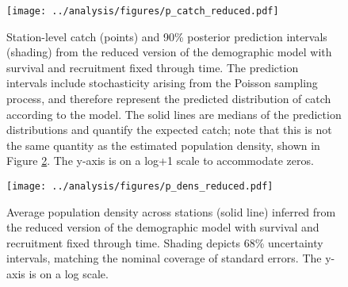\documentclass[11pt]{article}
\begin{document}
\begin{figure}
\centering
\texttt{[image: ../analysis/figures/p\_catch\_reduced.pdf]}
\caption{\label{fig:p_catch_reduced}
Station-level catch (points) and 90\% posterior prediction intervals (shading) 
from the reduced version of the demographic model 
with survival and recruitment fixed through time.
The prediction intervals include stochasticity arising from the Poisson sampling process,
and therefore represent the predicted distribution of catch according to the model. 
The solid lines are medians of the prediction distributions and quantify the expected
catch; note that this is not the same quantity as the estimated population density, 
shown in Figure \ref{fig:p_dens_reduced}.
The y-axis is on a log+1 scale to accommodate zeros.
}
\end{figure}
\clearpage

\clearpage
\begin{figure}
\centering
\texttt{[image: ../analysis/figures/p\_dens\_reduced.pdf]}
\caption{\label{fig:p_dens_reduced}
Average population density across stations (solid line)
inferred from the reduced version of the demographic model 
with survival and recruitment fixed through time.
Shading depicts 68\% uncertainty intervals, 
matching the nominal coverage of standard errors.
The y-axis is on a log scale.
}
\end{figure}
\clearpage
\end{document}

